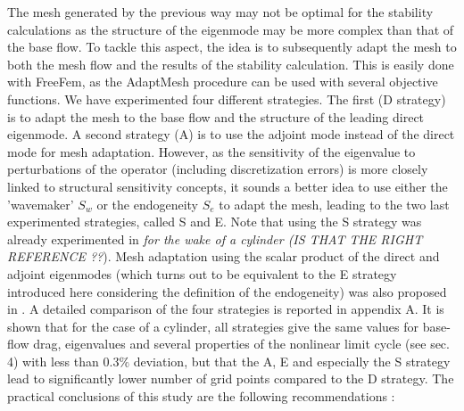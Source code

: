 \documentclass[twocolumn,10pt]{asme2ej}
\begin{document}
The mesh generated by the previous way may not be optimal for the stability calculations as the structure of the eigenmode may be more complex than that of the base flow. 
To tackle this aspect, the idea is to subsequently adapt the mesh to both the mesh flow and the results of the stability calculation.
This is easily done with FreeFem, as the  AdaptMesh procedure can be used with several objective functions.
We have experimented four different strategies.
The first (D strategy) is to adapt the mesh to the base flow and the structure of the leading direct eigenmode.
A second strategy (A) is to use the adjoint mode instead of the direct mode for mesh adaptation.
However, as the sensitivity of the eigenvalue to perturbations of the operator (including discretization errors) is more closely linked to structural sensitivity concepts, it sounds a better idea to use either the 'wavemaker' $S_w$ or the endogeneity $S_e$ to adapt the mesh, leading to the two last experimented strategies, called S and E.
Note that using the S strategy was already experimented in {\em \cite{GiannettiLuchini} for the wake of a cylinder (IS THAT THE RIGHT REFERENCE ??}).
Mesh adaptation using the scalar product of the direct and adjoint eigenmodes (which turns out to be equivalent to the E strategy introduced here considering the definition of the endogeneity) was also proposed in \cite{mavripilis2015adjoint}.
A detailed comparison of the four strategies is reported in appendix A.
It is shown that for the case of a cylinder, all strategies give the same values for base-flow drag, eigenvalues and several properties of the nonlinear limit cycle (see sec. 4) with less than $0.3\%$ deviation, but that the A, E and especially the S strategy lead to significantly lower number of grid points compared to the D strategy.
The practical conclusions of this study are the following recommendations :
\end{document}
